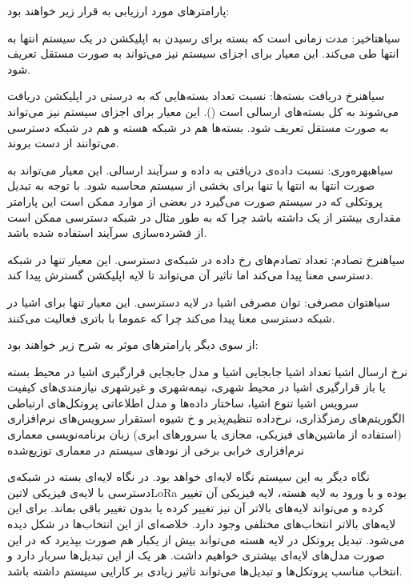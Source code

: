 پارامترهای مورد ارزیابی به قرار زیر خواهند بود:


 ‌سیاه{تاخیر}: مدت زمانی است که بسته برای رسیدن به اپلیکشن در یک سیستم انتها به انتها طی می‌کند. این معیار برای
اجزای سیستم نیز می‌تواند به صورت مستقل تعریف شود.

 ‌سیاه{نرخ دریافت بسته‌ها}: نسبت تعداد بسته‌هایی که به درستی در اپلیکشن دریافت می‌شوند به کل بسته‌های ارسالی است ().
این معیار برای اجزای سیستم
نیز می‌تواند به صورت مستقل تعریف شود. بسته‌ها هم در شبکه هسته و هم در شبکه دسترسی می‌توانند از دست بروند.

 ‌سیاه{بهره‌وری}: نسبت داده‌ی دریافتی به داده و سرآیند ارسالی. این معیار می‌تواند به صورت انتها به انتها یا تنها برای بخشی
از سیستم محاسبه شود. با توجه به تبدیل پروتکلی که در سیستم صورت می‌گیرد در بعضی از موارد ممکن است این پارامتر مقداری
بیشتر از یک داشته باشد چرا که به طور مثال در شبکه دسترسی ممکن است از فشرده‌سازی سرآیند استفاده شده باشد.

 ‌سیاه{نرخ تصادم}: تعداد تصادم‌های رخ داده در شبکه‌ی دسترسی. این معیار تنها در شبکه دسترسی معنا پیدا می‌کند
اما تاثیر آن می‌تواند تا لایه اپلیکشن گسترش پیدا کند.

 ‌سیاه{توان مصرفی}: توان مصرفی اشیا در لایه دسترسی. این معیار تنها برای اشیا در شبکه دسترسی معنا پیدا می‌کند
چرا که عموما با باتری فعالیت می‌کنند.


از سوی دیگر پارامترهای موثر به شرح زیر خواهند بود:

 نرخ ارسال اشیا
 تعداد اشیا
 جابجایی اشیا و مدل جابجایی
 قرارگیری اشیا در محیط بسته یا باز
 قرارگیری اشیا در محیط شهری، نیمه‌شهری و غیرشهری
 نیازمندی‌های کیفیت سرویس اشیا
 تنوع اشیا، ساختار داده‌ها و مدل اطلاعاتی
 پروتکل‌های ارتباطی
 الگوریتم‌های رمزگذاری، نرخ‌داده تنظیم‌پذیر و ‌خ
 شیوه استقرار سرویس‌های نرم‌افزاری (استفاده از ماشین‌های فیزیکی، مجازی یا سرورهای ابری)
 زبان برنامه‌نویسی
 معماری نرم‌افزاری
 خرابی برخی از نودهای سیستم در معماری توزیع‌شده

نگاه دیگر به این سیستم نگاه لایه‌ای خواهد بود. در نگاه لایه‌ای بسته در شبکه‌ی دسترسی با لایه‌ی فیزیکی ‌لاتین{LoRa} بوده و با ورود به لایه هسته،
لایه فیزیکی آن تغییر کرده و می‌تواند لایه‌های بالاتر آن نیز تغییر کرده یا بدون تغییر باقی بماند. برای این لایه‌های بالاتر انتخاب‌های مختلفی وجود دارد.
خلاصه‌ای از این انتخاب‌ها در شکل  دیده می‌شود.
تبدیل پروتکل در لایه هسته می‌تواند بیش از یکبار هم صورت بپذیرد که در این صورت مدل‌های لایه‌ای بیشتری خواهیم داشت. هر یک از این تبدیل‌ها
سربار دارد و انتخاب مناسب پروتکل‌ها و تبدیل‌ها می‌تواند تاثیر زیادی بر کارایی سیستم داشته باشد.

